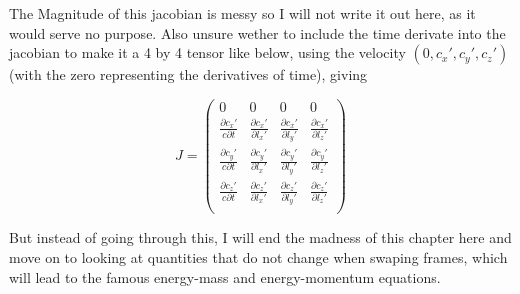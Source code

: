 


The Magnitude of this jacobian is messy so I will not write it out here, as it would serve no purpose.
Also unsure wether to include the time derivate into the jacobian to make it a 4 by 4 tensor like below, using the velocity $( 0 , c_x' , c_y' , c_z' )$ (with the zero representing the derivatives of time), giving

\begin{equation}
	J =
	\begin{pmatrix}
		0                                 & 0                               & 0                               & 0                               \\
		\frac{\partial c_x'}{c \partial t} & \frac{\partial c_x'}{\partial l_x'} & \frac{\partial c_x'}{\partial l_y'} & \frac{\partial c_x'}{\partial l_z'} \\
		\frac{\partial c_y'}{c \partial t} & \frac{\partial c_y'}{\partial l_x'} & \frac{\partial c_y'}{\partial l_y'} & \frac{\partial c_y'}{\partial l_z'} \\
		\frac{\partial c_z'}{c \partial t} & \frac{\partial c_z'}{\partial l_x'} & \frac{\partial c_z'}{\partial l_y'} & \frac{\partial c_z'}{\partial l_z'} \\
	\end{pmatrix}
\end{equation}

But instead of going through this, I will end the madness of this chapter here and move on to looking at quantities that do not change when swaping frames, which will lead to the famous energy-mass and energy-momentum equations.



